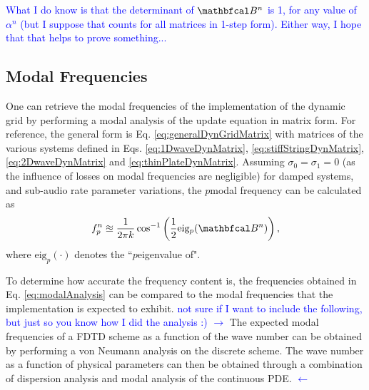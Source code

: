 \documentclass[fleqn]{jaes}
\def\SWcomment[#1]{\textcolor{blue}{#1}}
\begin{document}
\SWcomment[
What I do know is that the determinant of $\BB$ is 1, for any value of $\alpha^n$ (but I suppose that counts for all matrices in 1-step form). Either way, I hope that that helps to prove something...]

\subsection{Modal Frequencies}

One can retrieve the modal frequencies of the implementation of the dynamic grid by performing a modal analysis of the update equation in matrix form. For reference, the general form is Eq. \eqref{eq:generalDynGridMatrix} with matrices of the various systems defined in Eqs. \eqref{eq:1DwaveDynMatrix}, \eqref{eq:stiffStringDynMatrix}, \eqref{eq:2DwaveDynMatrix} and \eqref{eq:thinPlateDynMatrix}. Assuming $\sigma_0 = \sigma_1 = 0$ (as the influence of losses on modal frequencies are negligible) for damped systems, and sub-audio rate parameter variations, the $p$\th modal frequency can be calculated as
\begin{equation}\label{eq:modalAnalysis}
    f_p^n \approxeq \frac{1}{2 \pi k}\cos^{-1}\left(\frac{1}{2}\text{eig}_p(\BB)\right),
\end{equation}
where $\text{eig}_p(\cdot)$ denotes the ``$p$\th eigenvalue of".

To determine how accurate the frequency content is, the frequencies obtained in Eq. \eqref{eq:modalAnalysis} can be compared to the modal frequencies that the implementation is expected to exhibit. \SWcomment[not sure if I want to include the following, but just so you know how I did the analysis :) $\rightarrow$]
The expected modal frequencies of a FDTD scheme as a function of the wave number can be obtained by performing a von Neumann analysis on the discrete scheme. The wave number as a function of physical parameters can then be obtained through a combination of dispersion analysis and modal analysis of the continuous PDE. \SWcomment[$\leftarrow$]
\end{document}
